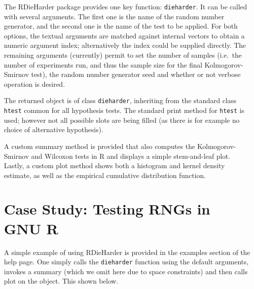 \documentclass[12pt]{article}
\begin{document}
The RDieHarder package provides one key function: \texttt{dieharder}.  It can
be called with several arguments. The first one is the name of the random
number generator, and the second one is the name of the test to be applied.
For both options, the textual arguments are matched against internal vectors
to obtain a numeric argument index; alternatively the index could be supplied
directly. The remaining arguments (currently) permit to set the number of
samples (i.e.~the number of experiments run, and thus the sample size for the
final Kolmogorov-Smirnov test), the random number generator seed and whether
or not verbose operation is desired.

The returned object is of class \texttt{dieharder}, inheriting from the
standard class \texttt{htest} common for all hypothesis tests.  The standard
print method for \texttt{htest} is used; however not all possible slots are
being filled (as there is for example no choice of alternative hypothesis).

A custom summary method is provided that also computes the Kolmogorov-Smirnov
and Wilcoxon tests in R and displays a simple stem-and-leaf plot.  Lastly, a
custom plot method shows both a histogram and kernel density estimate, as
well as the empirical cumulative distribution function.


\section{Case Study: Testing RNGs in GNU R}

A simple example of using RDieHarder is provided in the examples section of
the help page. One simply calls the \texttt{dieharder} function using the
default arguments, invokes a summary (which we omit here due to space
constraints) and then calls plot on the object. This shown below.
\end{document}
